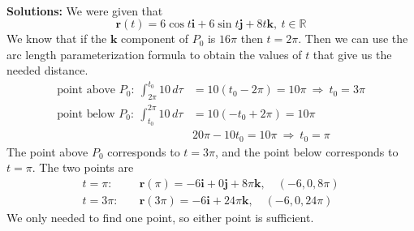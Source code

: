 \begin{enumerate}
        \ifnum {} {\color{DarkBlue} \\[12pt] 
        \textbf{Solutions:} We were given that $$\mathbf r(t) = 6\cos t \mathbf i + 6 \sin t \mathbf j + 8t\mathbf k, \ t \in \mathbb R$$ We know that if the $\mathbf k$ component of $P_0$ is $16\pi$ then $t=2\pi$. Then we can use the arc length parameterization formula to obtain the values of $t$ that give us the needed distance. 
        \begin{align}
            \text{point above } P_0: \ \int_{2\pi}^{t_0} 10 \, d\tau &= 10(t_0 - 2\pi) = 10\pi \ \Rightarrow \ t_0 = 3\pi\\
            \text{point below } P_0: \ \int_{t_0}^{2\pi} 10 \, d\tau 
            &= 10(- t_0 + 2\pi) = 10\pi \\
            & 20\pi - 10 t_0 = 10\pi \ \Rightarrow \ t_0 = \pi
        \end{align}
        The point above $P_0$ corresponds to $t=3\pi$, and the point below corresponds to $t = \pi$. The two points are 
        \begin{align}
            t = \pi: \quad & \mathbf r(\pi) = -6\mathbf i + 0\mathbf j + 8\pi\mathbf k , \quad (-6,0,8\pi)\\
            t = 3\pi: \quad & \mathbf r(3\pi) = -6\mathbf i + 24\pi\mathbf k , \quad (-6,0,24\pi)
        \end{align}
        We only needed to find one point, so either point is sufficient. 
        } 
        \else 
        \fi
    \end{enumerate}
\fi



